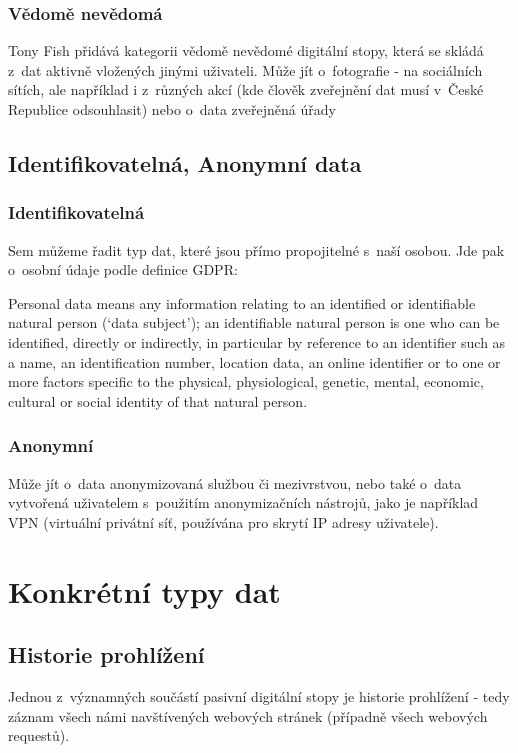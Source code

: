 \subsubsection{Vědomě nevědomá}

Tony Fish přidává kategorii vědomě nevědomé digitální stopy, která se skládá z~dat aktivně vložených jinými uživateli.\citep{fish-digital-footprint}
Může jít o~fotografie - na sociálních sítích, ale například i z~různých akcí (kde člověk zveřejnění dat musí v~České Republice odsouhlasit) nebo o~data zveřejněná úřady

\subsection{Identifikovatelná, Anonymní data}

\subsubsection{Identifikovatelná}

Sem můžeme řadit typ dat, které jsou přímo propojitelné s~naší osobou. Jde pak o~osobní údaje podle definice GDPR:

\begin{displayquote}
Personal data means any information relating to an identified or identifiable natural person (‘data subject’); an identifiable natural person is one who can be identified, directly or indirectly, in particular by reference to an identifier such as a name, an identification number, location data, an online identifier or to one or more factors specific to the physical, physiological, genetic, mental, economic, cultural or social identity of that natural person.\citep{gdpr}
\end{displayquote}

\subsubsection{Anonymní}

Může jít o~data anonymizovaná službou či mezivrstvou, nebo také o~data vytvořená uživatelem s~použitím anonymizačních nástrojů, jako je například VPN (virtuální privátní síť, používána pro skrytí IP adresy uživatele).

\section{Konkrétní typy dat}

\subsection{Historie prohlížení}
Jednou z~významných součástí pasivní digitální stopy je historie prohlížení - tedy záznam všech námi navštívených webových stránek (případně všech webových requestů).


